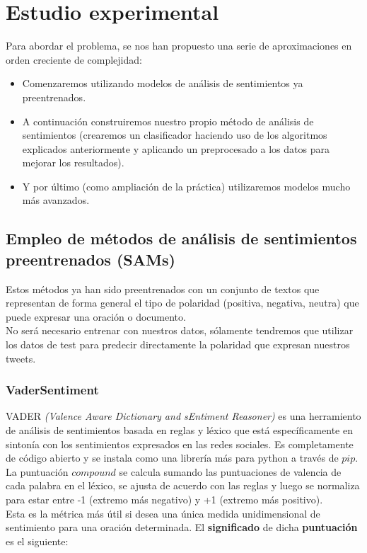 \documentclass[a4paper,12pt]{report}
\begin{document}
\chapter{Estudio experimental}

Para abordar el problema, se nos han propuesto una serie de aproximaciones en orden creciente de complejidad:

\begin{itemize}

\item Comenzaremos utilizando modelos de análisis de sentimientos ya preentrenados.
\item A continuación construiremos nuestro propio método de análisis de sentimientos (crearemos un clasificador haciendo uso de los algoritmos explicados anteriormente y aplicando un preprocesado a los datos para mejorar los resultados).
\item Y por último (como ampliación de la práctica) utilizaremos modelos mucho más avanzados.
\end{itemize}


\section{Empleo de métodos de análisis de sentimientos preentrenados (SAMs)}

{\setlength{\parindent}{0cm}
Estos métodos ya han sido preentrenados con un conjunto de textos que representan de forma general el tipo de polaridad (positiva, negativa, neutra) que puede expresar una oración o documento. }
\vspace{2mm}\\
No será necesario entrenar con nuestros datos, sólamente tendremos que utilizar los datos de test para predecir directamente la polaridad que expresan nuestros tweets.

\subsection{VaderSentiment}

{\setlength{\parindent}{0cm}
VADER \textit{(Valence Aware Dictionary and sEntiment Reasoner)} es una herramiento de análisis de sentimientos basada en reglas y léxico que está específicamente en sintonía con los sentimientos expresados en las redes sociales. Es completamente de código abierto y se instala como una librería más para python a través de $pip$.}
\vspace{2mm}\\
La puntuación $compound$ se calcula sumando las puntuaciones de valencia de cada palabra en el léxico, se ajusta de acuerdo con las reglas y luego se normaliza para estar entre -1 (extremo más negativo) y +1 (extremo más positivo).
\vspace{2mm}\\
Esta es la métrica más útil si desea una única medida unidimensional de sentimiento para una oración determinada.
\clearpage
El \textbf{significado} de dicha \textbf{puntuación} es el siguiente:
\end{document}
